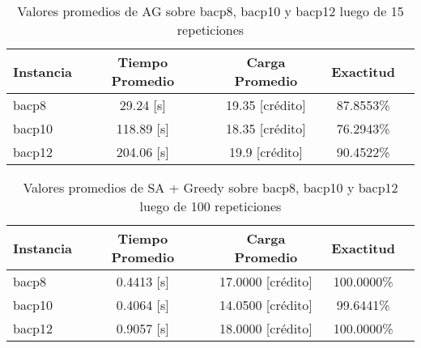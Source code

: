 \documentclass[letterpaper,10pt]{article}
\begin{document}
\pagecolor{orange}
\begin{table}[H]
  \centering
  \begin{tabular}{@{}lcccc@{}}
    \toprule[1pt]
    Instancia & Tiempo Promedio & Carga Promedio & Exactitud\\
    \midrule
     bacp8 &   29.24 [s] & 19.35 [crédito] &  87.8553\% \\
    bacp10 &  118.89 [s] & 18.35 [crédito] &  76.2943\% \\
    bacp12 &  204.06 [s] &  19.9 [crédito] &  90.4522\% \\
    \bottomrule
  \end{tabular}
  \caption{Valores promedios de AG sobre bacp8, bacp10 y bacp12 luego de 15 repeticiones}
\end{table}

\begin{table}[H]
  \centering
  \begin{tabular}{@{}lcccc@{}}
    \toprule[1pt]
    Instancia & Tiempo Promedio & Carga Promedio & Exactitud \\
    \midrule
     bacp8 &  0.4413 [s] & 17.0000 [crédito] & 100.0000\% \\
    bacp10 &  0.4064 [s] & 14.0500 [crédito] &  99.6441\% \\
    bacp12 &  0.9057 [s] & 18.0000 [crédito] & 100.0000\% \\
    \bottomrule
  \end{tabular}
  \caption{Valores promedios de SA + Greedy sobre bacp8, bacp10 y bacp12 luego de 100 repeticiones}
\end{table}
\end{document}
